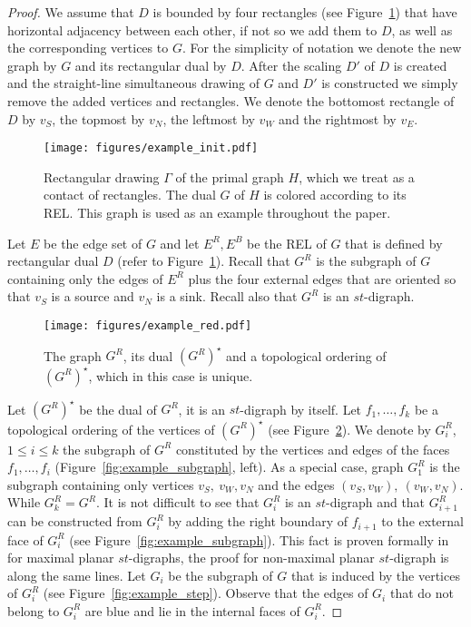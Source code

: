 \documentclass{llncs}
\begin{document}
\begin{proof}

We assume that $D$ is bounded by four rectangles (see Figure~\ref{fig:example_init}) that have horizontal adjacency between each other, if not so we add them to $D$, as well as the corresponding vertices to $G$.   For the simplicity of notation we denote the new graph by $G$ and its rectangular dual by $D$. After the scaling $D'$ of $D$ is created and the straight-line simultaneous drawing of $G$ and  $D'$ is constructed we simply remove the added vertices and rectangles. We denote the bottomost rectangle of $D$ by $v_S$, the topmost by $v_N$, the leftmost by $v_W$ and the rightmost by $v_E$.  
 
\begin{figure}[htb]
\centering
\texttt{[image: figures/example\_init.pdf]}
\caption{Rectangular drawing $\Gamma$ of the primal graph $H$, which we treat as a contact of rectangles. The dual  $G$ of $H$ is colored according to its REL. This graph is used as an example throughout the paper.}
\label{fig:example_init}
\end{figure} 
 
Let  $E$ be the edge set of $G$ and let $E^R, E^B$ be the REL of $G$ that is defined by rectangular dual $D$ (refer to Figure~\ref{fig:example_init}).  Recall that $G^R$ is the subgraph of $G$ containing only the edges of $E^R$ plus the four external edges that are oriented so that $v_S$ is a source and $v_N$ is a sink. Recall also that   $G^R$ is an $st$-digraph. 


\begin{figure}[htb]
\centering
\texttt{[image: figures/example\_red.pdf]}
\caption{ The graph $G^R$, its dual $(G^R)^\star$ and a topological ordering of $(G^R)^\star$, which in this case is unique. }
\label{fig:example_red}
\end{figure}

Let $(G^R)^\star$ be the  dual of $G^R$, it is an $st$-digraph by itself. Let $f_1,\dots,f_k$ be a topological ordering of the vertices of  $(G^R)^\star$ (see Figure~\ref{fig:example_red}). We denote by $G^R_i$, $1\leq i \leq k$ the subgraph of $G^R$ constituted by the vertices and edges of the faces $f_1,\dots,f_i$ (Figure~\ref{fig:example_subgraph}, left). As a special case, graph $G_1^R$ is the subgraph containing only vertices $v_S,~v_W, v_N$ and the edges $(v_S,v_W),~(v_W,v_N)$. While $G_k^R=G^R$.   It is not difficult to see that $G^R_i$ is an $st$-digraph and that $G^R_{i+1}$  can be constructed from $G^R_i$ by adding the right boundary of $f_{i+1}$ to the external face of $G^R_i$ (see Figure~\ref{fig:example_subgraph}). This fact is proven formally in~\cite[Lemma 4]{GiordanoLMSW15} for maximal planar $st$-digraphs, the proof for non-maximal planar $st$-digraph is along the same lines.   
Let $G_i$ be the subgraph of $G$ that is induced by the vertices of  
  $G^R_i$ (see Figure~\ref{fig:example_step}). Observe that the edges of $G_i$ that do not belong to $G_i^R$ are blue and lie in the internal faces of $G_i^R$.


\end{proof}
\end{document}
